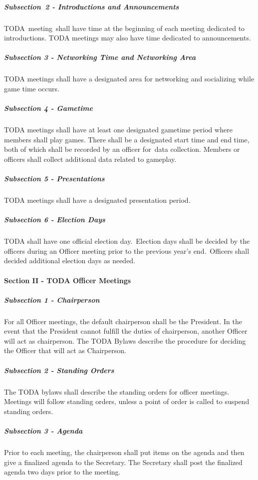 \documentclass[12pt]{report}
\begin{document}
\subparagraph{Subsection\  2 - Introductions and Announcements}
\tab TODA\ meeting\ shall have time at the beginning of each meeting dedicated to introductions.  TODA meetings may also have time dedicated to announcements.  \par

\subparagraph{Subsection 3 - Networking Time and Networking Area}
\tab TODA meetings shall have a designated area for networking and socializing while game time occurs. \par

\subparagraph{Subsection 4 - Gametime}
\tab \tab TODA meetings shall have at least one designated gametime period where members shall play games. There shall be a designated start time and end time, both of which shall be recorded by an officer for\ data collection.  Members or officers shall collect additional data related to gameplay.\par

\subparagraph{Subsection 5 - Presentations}
\tab \tab TODA meetings shall have a designated presentation period.\par

\subparagraph{Subsection 6 - Election Days}
TODA shall have one official election day.\  Election days shall be decided by the officers during an Officer meeting prior to the previous year’s end.\  Officers shall decided additional election days as needed.\par

\paragraph*{Section II - TODA Officer Meetings}
\subparagraph{Subsection 1 - Chairperson}
\tab For all Officer meetings, the default chairperson shall be the President. In the event that the President cannot fulfill the duties of chairperson, another Officer will act as chairperson. The TODA Bylaws describe the procedure for deciding the Officer that will act as Chairperson.\par

\subparagraph{Subsection 2 - Standing Orders}
\tab The TODA bylaws shall describe the standing orders for officer meetings. Meetings will follow standing orders, unless a point of order is called to suspend standing orders.\par

\subparagraph{Subsection 3 - Agenda}
\tab Prior to each meeting, the chairperson shall put items on the agenda and then give a finalized agenda to the Secretary. The Secretary shall post the finalized agenda two days prior to the meeting.\par
\end{document}
